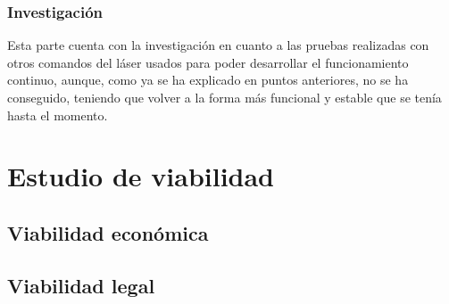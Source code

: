 \subsubsection{Investigación}
Esta parte cuenta con la investigación en cuanto a las pruebas realizadas con otros comandos del láser usados para poder desarrollar el funcionamiento continuo, aunque, como ya se ha explicado en puntos anteriores, no se ha conseguido, teniendo que volver a la forma más funcional y estable que se tenía hasta el momento.
\section{Estudio de viabilidad}

\subsection{Viabilidad económica}

\subsection{Viabilidad legal}


